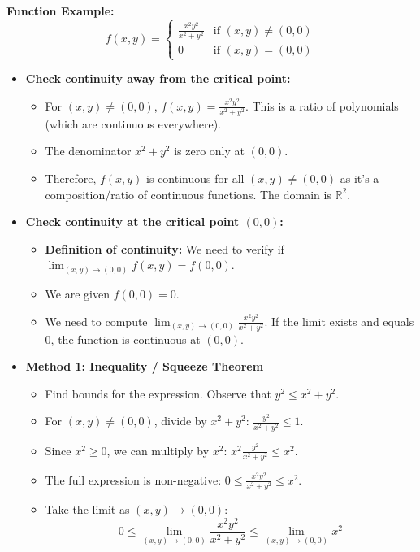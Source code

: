 \begin{cascade}
	\textbf{Function Example:}
	\[ f(x, y) = \begin{cases} \frac{x^2 y^2}{x^2 + y^2} & \text{if } (x, y) \neq (0, 0) \\ 0 & \text{if } (x, y) = (0, 0) \end{cases} \]
	\begin{itemize}
		\item \textbf{Check continuity away from the critical point:}
		      \begin{itemize}
			      \item For $(x, y) \neq (0, 0)$, $f(x, y) = \frac{x^2 y^2}{x^2 + y^2}$. This is a ratio of polynomials (which are continuous everywhere).
			      \item The denominator $x^2 + y^2$ is zero only at $(0, 0)$.
			      \item Therefore, $f(x, y)$ is continuous for all $(x, y) \neq (0, 0)$ as it's a composition/ratio of continuous functions. The domain is $\mathbb{R}^2$.
		      \end{itemize}
		\item \textbf{Check continuity at the critical point $(0, 0)$:}
		      \begin{itemize}
			      \item \textbf{Definition of continuity:} We need to verify if $\lim_{(x,y) \to (0,0)} f(x, y) = f(0, 0)$.
			      \item We are given $f(0, 0) = 0$.
			      \item We need to compute $\lim_{(x,y) \to (0,0)} \frac{x^2 y^2}{x^2 + y^2}$. If the limit exists and equals 0, the function is continuous at $(0,0)$.
		      \end{itemize}
		\item \textbf{Method 1: Inequality / Squeeze Theorem}
		      \begin{itemize}
			      \item Find bounds for the expression. Observe that $y^2 \le x^2 + y^2$.
			      \item For $(x, y) \neq (0, 0)$, divide by $x^2+y^2$: $\frac{y^2}{x^2 + y^2} \le 1$.
			      \item Since $x^2 \ge 0$, we can multiply by $x^2$: $x^2 \frac{y^2}{x^2 + y^2} \le x^2$.
			      \item The full expression is non-negative: $0 \le \frac{x^2 y^2}{x^2 + y^2} \le x^2$.
			      \item Take the limit as $(x,y) \to (0,0)$:
			            \[ 0 \le \lim_{(x,y) \to (0,0)} \frac{x^2 y^2}{x^2 + y^2} \le \lim_{(x,y) \to (0,0)} x^2 \]

\end{itemize}
\end{itemize}
\end{cascade}
